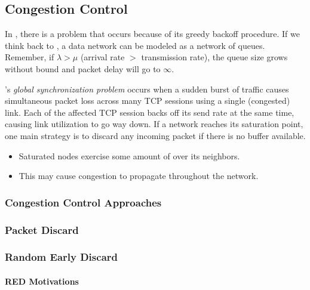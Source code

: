 \subsection{Congestion Control}\label{subsec:Congestion_Control}

In , there is a problem that occurs because of its greedy backoff procedure.
If we think back to , a data network can be modeled as a network of queues.
Remember, if $\lambda > \mu$ (arrival rate $>$ transmission rate), the queue size grows without bound and packet delay will go to $\infty$.

\begin{definition}\label{def:TCP_Global_Synchronization_Problem}
  's \emph{global synchronization problem} occurs when a sudden burst of traffic causes simultaneous packet loss across many TCP sessions using a single (congested) link.
  Each of the affected TCP session backs off its send rate at the same time, causing link utilization to go way down.
If a network reaches its saturation point, one main strategy is to discard any incoming packet if there is no buffer available.
\begin{itemize}[noitemsep]
\item Saturated nodes exercise some amount of  over its neighbors.
\item This may cause congestion to propagate throughout the network.
\end{itemize}

\subsubsection{Congestion Control Approaches}\label{subsubsec:Congestion_Control_Approaches}
\subsubsection{Packet Discard}\label{subsubsec:Packet_Discard}
\end{definition}

\subsubsection{Random Early Discard}\label{subsubsec:Random_Early_Discard}
\paragraph{RED Motivations}\label{par:Random_Early_Discard_Motivations}
